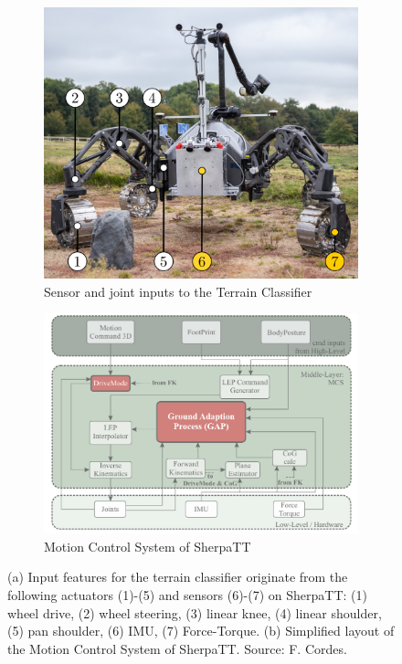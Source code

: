 \documentclass{article}
\begin{document}
\begin{figure}[!htb]
    \begin{subfigure}[t]{0.44\textwidth}
        \includegraphics[width=\textwidth]{../figures/terrain_classifier_sensor_inputs.png}
        \caption{\label{fig:SensorInputs}Sensor and joint inputs to the Terrain Classifier}
    \end{subfigure}
    \begin{subfigure}[t]{0.55\textwidth}
        \includegraphics[width=\textwidth]{../figures/MCS-Structure.pdf}
        \caption{\label{fig:MCS}Motion Control System of SherpaTT \cite{cordes_phd_2018}}
    \end{subfigure}
     \caption{\label{fig:Loco}(a) Input features for the terrain classifier originate from the following actuators (1)-(5) and sensors (6)-(7) on SherpaTT: (1) wheel drive, (2) wheel steering, (3) linear knee, (4) linear shoulder, (5) pan shoulder, (6) IMU, (7) Force-Torque. (b) Simplified layout of the Motion Control System of SherpaTT. Source: F. Cordes.}
\end{figure}
\end{document}
